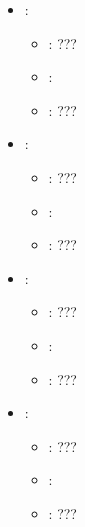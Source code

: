 \begin{itemize}
    \item {}:
           \begin{itemize}
                \item \optionPossibleValues{}: ???
                \item \optionDefaultValue{}: 
                \item \optionDescrption{}: ???
           \end{itemize}
    \item {}:
           \begin{itemize}
                \item \optionPossibleValues{}: ???
                \item \optionDefaultValue{}: 
                \item \optionDescrption{}: ???
           \end{itemize}
    \item {}:
           \begin{itemize}
                \item \optionPossibleValues{}: ???
                \item \optionDefaultValue{}: 
                \item \optionDescrption{}: ???
           \end{itemize}
    \item {}:
           \begin{itemize}
                \item \optionPossibleValues{}: ???
                \item \optionDefaultValue{}: 
                \item \optionDescrption{}: ???
           \end{itemize}
\end{itemize}
